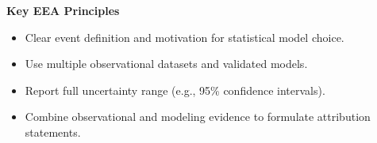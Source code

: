 \documentclass[fontsize=8pt, a4paper, landscape, fleqn]{scrartcl}
\renewcommand{\subsection}[1]{%
    \noindent\colorbox{subsectioncolor}{%
        \parbox{\dimexpr\columnwidth-2\fboxsep}{\color{white}\textbf{#1}}}%
    \vspace{0.5mm}%
}
\begin{document}
\begin{multicols*}{3}[\raggedcolumns]
\subsection{Key EEA Principles}
\begin{itemize}
    \item Clear event definition and motivation for statistical model choice.
    \item Use multiple observational datasets and validated models.
    \item Report full uncertainty range (e.g., 95\% confidence intervals).
    \item Combine observational and modeling evidence to formulate attribution statements.
\end{itemize}


\end{multicols*}
\end{document}
